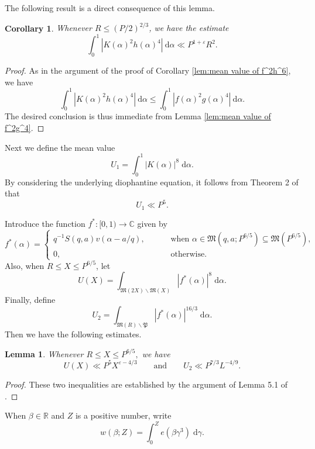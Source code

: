 \documentclass[12pt,english,reqno]{amsart}
\theoremstyle{definition}
\theoremstyle{remark}
\numberwithin{equation}{section}
\numberwithin{equation}{section}
\numberwithin{figure}{section}
\theoremstyle{plain}
\theoremstyle{plain}
\theoremstyle{plain}
\newtheorem{lem}[thm]{Lemma}
\theoremstyle{plain}
\newtheorem{cor}[thm]{Corollary}
\numberwithin{equation}{section}
\numberwithin{thm}{section}
\begin{document}
The following result is a direct consequence of this lemma.
\begin{cor}
\label{lem:estimate for K^2h^4}Whenever $R\leq(P/2)^{2/3}$, we have
the estimate
\[
\int_{0}^{1}|K(\alpha)^{2}h(\alpha)^{4}|\:\mathrm{d}\alpha\ll P^{1+\varepsilon}R^{2}.\]
\end{cor}
\begin{proof}
As in the argument of the proof of Corollary \ref{lem:mean value of f^2h^6},
we have
\[
\int_{0}^{1}|K(\alpha)^{2}h(\alpha)^{4}|\:\mathrm{d}\alpha\leq\int_{0}^{1}|f(\alpha)^{2}g(\alpha)^{4}|\:\mathrm{d}\alpha.\]
The desired conclusion is thus immediate from Lemma \ref{lem:mean value of f^2g^4}.
\end{proof}
\par Next we define the mean value
\[ U_1=\int_{0}^{1}|K(\alpha)|^8\;\mathrm{d}\alpha.\]
By considering the underlying diophantine equation, it follows from Theorem 2 of \cite{vaughan1986} that
\begin{equation}
U_1\ll P^{5}.\label{eq:|K|^8}\end{equation}
\par Introduce the function $f^{*}:[0,1)\rightarrow\mathbb{C}$ given by
\begin{equation}
f^{*}(\alpha)=\begin{cases}
q^{-1}S(q,a)v(\alpha-a/q),\qquad & \text{ when }\alpha\in\mathfrak{M}(q,a;P^{6/5})\subseteq\mathfrak{M}(P^{6/5}),\\
0, & \text{ otherwise}.\end{cases}\label{eq:f*}\end{equation}
Also, when $R\leq X\leq P^{6/5}$, let
\[U(X)=\int_{\mathfrak{M}(2X)\backslash\mathfrak{M}(X)}|f^*(\alpha)|^8\;\mathrm{d}\alpha. \] 
Finally, define
\[U_2=\int_{\mathfrak{M}(R)\backslash\mathfrak{P}}|f^*(\alpha)|^{16/3}\;\mathrm{d}\alpha.\]
Then we have the following estimates.
\begin{lem}
\label{lem:mean of f*^8 and f*^16/3}Whenever $R\leq X\leq P^{6/5},$
we have
\[
U(X)\ll P^{5}X^{\varepsilon-4/3}\qquad\text{and}\qquad U_2\ll P^{7/3}L^{-4/9}.\]
\end{lem}
\begin{proof}
These two inequalities are established by the argument of Lemma 5.1 of \cite{vaughan1989}.\end{proof}
When $\beta\in\mathbb{R}$ and $Z$ is a positive number, write
\begin{equation}
w(\beta;Z)=\int_{0}^{Z}e(\beta\gamma^3)\;\mathrm{d}\gamma.\label{eq:w}\end{equation}
\end{document}
